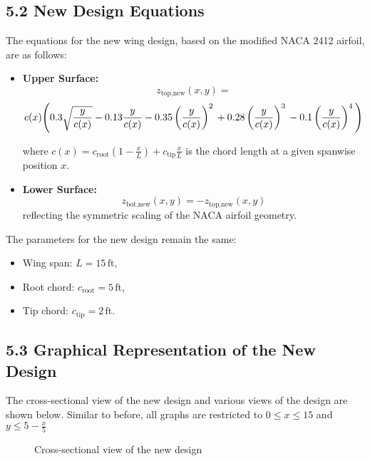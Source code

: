 \documentclass[12pt]{article}
\begin{document}
\subsection*{5.2 New Design Equations}

The equations for the new wing design, based on the modified NACA 2412 airfoil, are as follows:
\begin{itemize}
    \item \textbf{Upper Surface:}
    \[
z_{\text{top,new}}(x, y) = 
\]
{\small
\[
c(x)\Bigg( 
0.3 \sqrt{\frac{y}{c(x)}} \\
- 0.13 \frac{y}{c(x)} \\
- 0.35 \left(\frac{y}{c(x)}\right)^2 \\
+ 0.28 \left(\frac{y}{c(x)}\right)^3 \\
- 0.1\left(\frac{y}{c(x)}\right)^4 
\Bigg)
\]
}



    where \( c(x) = c_{\text{root}} \left( 1 - \frac{x}{L} \right) + c_{\text{tip}} \frac{x}{L} \) is the chord length at a given spanwise position \( x \).
    \item \textbf{Lower Surface:}
    \[
    z_{\text{bot,new}}(x, y) = -z_{\text{top,new}}(x, y)
    \]
    reflecting the symmetric scaling of the NACA airfoil geometry.
    
\end{itemize}

The parameters for the new design remain the same:
\begin{itemize}
    \item Wing span: \( L = 15 \, \text{ft} \),
    \item Root chord: \( c_{\text{root}} = 5 \, \text{ft} \),
    \item Tip chord: \( c_{\text{tip}} = 2 \, \text{ft} \).
\end{itemize}







\subsection*{5.3 Graphical Representation of the New Design}

The cross-sectional view of the new design and various views of the design are shown
below. Similar to before, all graphs are restricted to $0 \leq x \leq 15$ and $y \leq 5 - \frac{x}{5}$
\begin{figure}[H]
    \centering
    \caption{Cross-sectional view of the new design}
    \label{fig:5}
\end{figure}
\end{document}
